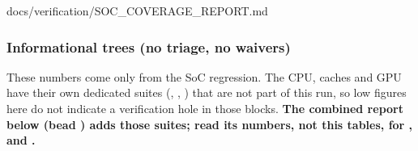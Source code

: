 \begin{relocated}{docs/verification/SOC_COVERAGE_REPORT.md}
\subsubsection{Informational trees (no triage, no waivers)}\label{tm:flow:soc-coverage-report:informational-trees-no-triage-no-waivers}

These numbers come only from the SoC regression. The CPU, caches and GPU
have their own dedicated suites (,
, ) that are not part of this run,
so low figures here do not indicate a verification hole in those blocks.
\textbf{The combined report below (bead ) adds those suites;
read its numbers, not this table\textquotesingle s, for ,
 and .}

\begin{landscape}
\small\setlength{\tabcolsep}{4pt}


\end{landscape}
\end{relocated}
